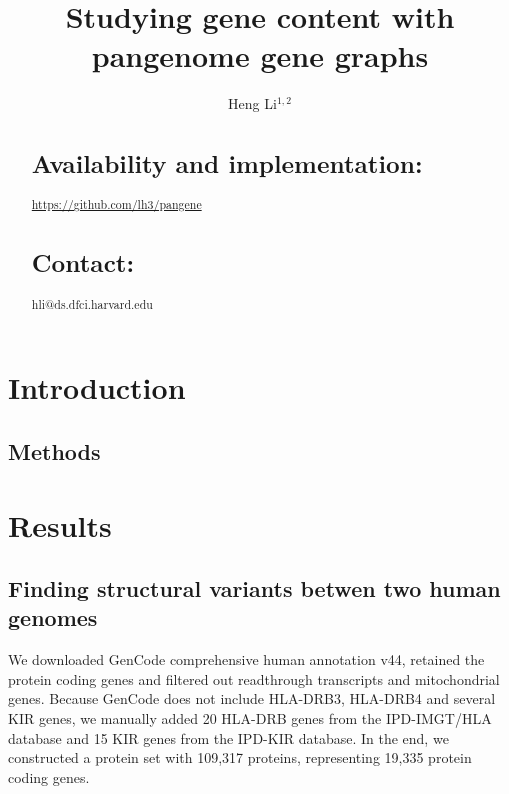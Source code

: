 \documentclass{bioinfo}
\begin{document}

\title[Pangene graphs]{Studying gene content with pangenome gene graphs}
\author[Li]{Heng Li$^{1,2}$}
\address{$^1$Dana-Farber Cancer Institute, 450 Brookline Ave, Boston, MA 02215, USA,
$^2$Harvard Medical School, 10 Shattuck St, Boston, MA 02215, USA}

\maketitle

\begin{abstract}

\section{Availability and implementation:}
\href{https://github.com/lh3/pangene}{https://github.com/lh3/pangene}

\section{Contact:} hli@ds.dfci.harvard.edu
\end{abstract}

\section*{Introduction}

\begin{methods}
\section*{Methods}
\end{methods}

\section*{Results}

\subsection*{Finding structural variants betwen two human genomes}

We downloaded GenCode comprehensive human annotation v44,
retained the protein coding genes and filtered out readthrough transcripts and mitochondrial genes.
Because GenCode does not include HLA-DRB3, HLA-DRB4 and several KIR genes,
we manually added 20 HLA-DRB genes from the IPD-IMGT/HLA database and
15 KIR genes from the IPD-KIR database.
In the end, we constructed a protein set with 109,317 proteins, representing 19,335 protein coding genes.
\end{document}
